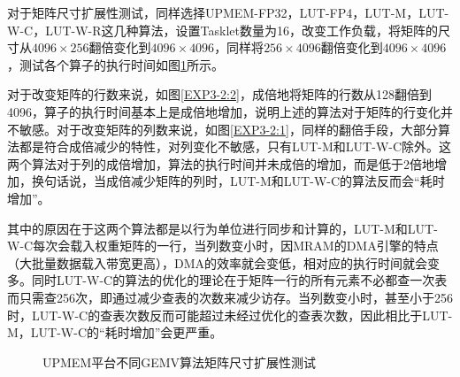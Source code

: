 对于矩阵尺寸扩展性测试，同样选择UPMEM-FP32，LUT-FP4，LUT-M，LUT-W-C，LUT-W-R这几种算法，设置Tasklet数量为16，改变工作负载，将矩阵的尺寸从$4096\times 256$翻倍变化到$4096\times 4096$，同样将$256\times 4096$翻倍变化到$4096\times 4096$，测试各个算子的执行时间如图\ref{EXP3-2}所示。

对于改变矩阵的行数来说，如图\ref{EXP3-2:2}，成倍地将矩阵的行数从128翻倍到4096，算子的执行时间基本上是成倍地增加，说明上述的算法对于矩阵的行变化并不敏感。对于改变矩阵的列数来说，如图\ref{EXP3-2:1}，同样的翻倍手段，大部分算法都是符合成倍减少的特性，对列变化不敏感，只有LUT-M和LUT-W-C除外。这两个算法对于列的成倍增加，算法的执行时间并未成倍的增加，而是低于2倍地增加，换句话说，当成倍减少矩阵的列时，LUT-M和LUT-W-C的算法反而会“耗时增加”。

其中的原因在于这两个算法都是以行为单位进行同步和计算的，LUT-M和LUT-W-C每次会载入权重矩阵的一行，当列数变小时，因MRAM的DMA引擎的特点（大批量数据载入带宽更高），DMA的效率就会变低，相对应的执行时间就会变多。同时LUT-W-C的算法的优化的理论在于矩阵一行的所有元素不必都查一次表而只需查256次，即通过减少查表的次数来减少访存。当列数变小时，甚至小于256时，LUT-W-C的查表次数反而可能超过未经过优化的查表次数，因此相比于LUT-M，LUT-W-C的“耗时增加”会更严重。

\begin{figure}[htbp!]
	\centering
	\caption{UPMEM平台不同GEMV算法矩阵尺寸扩展性测试}
	\label{EXP3-2}
\end{figure}

